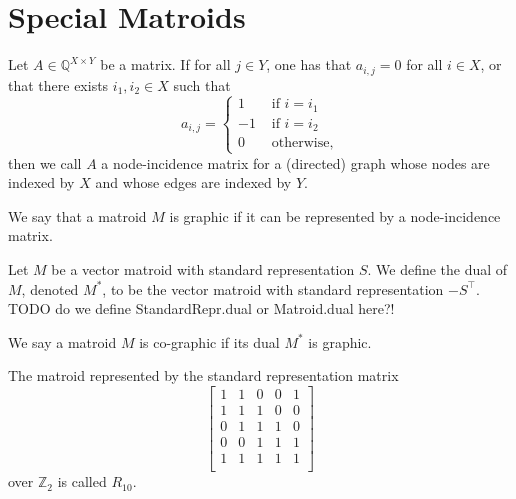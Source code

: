 \chapter{Special Matroids}

\begin{definition}
    \label{Matrix.IsGraphic}
    \leanok
    Let $A \in \mathbb{Q}^{X \times Y}$ be a matrix. If for all $j \in Y$, one has that $a_{i,j} = 0$ for all $i \in X$, or that there exists $i_1,i_2 \in X$ such that
    \[
    a_{i,j} = \begin{cases}
        1 & \text{ if $i = i_1$} \\
        -1 & \text{ if $i = i_2$} \\
        0 & \text{ otherwise},
    \end{cases}
    \]
    then we call $A$ a node-incidence matrix for a (directed) graph whose nodes are indexed by $X$ and whose edges are indexed by $Y$.
\end{definition}

\begin{definition}
    \label{Matroid.IsGraphic}
    \leanok
    We say that a matroid $M$ is graphic if it can be represented by a node-incidence matrix.
\end{definition}

\begin{definition}
    \label{StandardRepr.dual}
    \leanok
    Let $M$ be a vector matroid with standard representation $S$. We define the dual of $M$, denoted $M^*$, to be the vector matroid with standard representation $-S^\intercal$.
    TODO do we define StandardRepr.dual or Matroid.dual here?!
\end{definition}

\begin{definition}
    \label{Matroid.IsCographic}
    \leanok
    We say a matroid $M$ is co-graphic if its dual $M^*$ is graphic.
\end{definition}

\begin{definition}
    \label{matroidR10}
    \leanok
    The matroid represented by the standard representation matrix
    \[\begin{bmatrix}
        1 & 1 & 0 & 0 & 1 \\
        1 & 1 & 1 & 0 & 0 \\
        0 & 1 & 1 & 1 & 0 \\
        0 & 0 & 1 & 1 & 1 \\
        1 & 1 & 1 & 1 & 1 \\
    \end{bmatrix}\]
    over $\mathbb{Z}_2$ is called $R_{10}.$
\end{definition}

